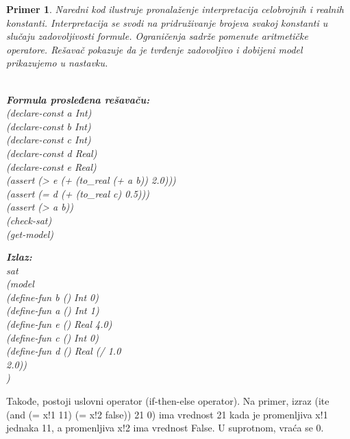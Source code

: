 \documentclass[12pt,oneside]{memoir}
\newcommand\tab[1][0.5cm]{\hspace*{#1}}
\newtheorem{primer}{Primer}
\begin{document}
\begin{primer} Naredni kod ilustruje pronalaženje interpretacija celobrojnih i realnih konstanti. Interpretacija se svodi na pridruživanje brojeva svakoj konstanti u slučaju zadovoljivosti formule. Ograničenja sadrže pomenute aritmetičke operatore. Rešavač pokazuje da je tvrđenje zadovoljivo i dobijeni model prikazujemo u nastavku.\\ \\
\begin{minipage}[b]{0.47\textwidth}
\textbf{Formula prosleđena rešavaču:}
\\(declare-const a Int)
\\(declare-const b Int)
\\(declare-const c Int)
\\(declare-const d Real)
\\(declare-const e Real)
\\(assert (> e (+ (to\_real (+ a b)) 2.0)))
\\(assert (= d (+ (to\_real c) 0.5)))
\\(assert (> a b))
\\(check-sat)
\\(get-model)
\end{minipage}
\hspace{1.6cm}
\begin{minipage}[t]{0.4\textwidth}
\vspace{-6.55cm}
\textbf{Izlaz:}
\\sat 
\\(model
\\\tab(define-fun b () Int 0) 
\\\tab(define-fun a () Int 1) 
\\\tab(define-fun e () Real 4.0) 
\\\tab(define-fun c () Int 0) 
\\\tab(define-fun d () Real (/ 1.0 
\\\tab 2.0))
\\)
\end{minipage}

\end{primer}


Takođe, postoji uslovni operator (if-then-else operator). Na primer,
izraz (ite (and (= x!1 11) (= x!2 false)) 21 0) ima vrednost 21 kada je promenljiva x!1 jednaka 11, a promenljiva x!2 ima vrednost False. U suprotnom, vraća se 0.
\end{document}
